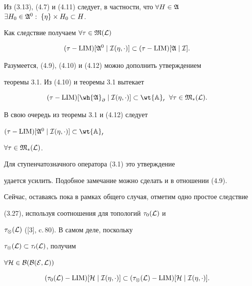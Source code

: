 Из (3.13), (4.7) и (4.11) следует, в частности, что $\forall H\in


\frak A$ $\exists H_0\in\frak A^0:\;\{\eta\}\times H_0\subset H$.


Как следствие получаем $\forall\tau\in\frak M(\cal L)$


\begin{equation}


(\tau-\LIM)[\frak A^0\mid\cal I(\eta,\cdot)]\subset


(\tau-\LIM)[\frak A\mid\cal I].


\end{equation}


Разумеется, (4.9), (4.10) и (4.12) можно дополнить утверждением


теоремы 3.1. Из (4.10) и теоремы 3.1 вытекает


\begin{equation}


(\tau-\LIM)[\wh{\frak A}_\partial\mid\cal I(\eta,


\cdot)]\subset\wt{\Bbb A}_0\ \;


\forall\tau\in\frak M_*(\cal L).


\end{equation}


В свою очередь из теоремы 3.1 и (4.12) следует


$(\tau-\LIM)[\frak A^0\mid\cal I(\eta,


\cdot)]\subset\wt{\Bbb A}_0$


$\forall\tau\in \frak M_*(\cal L)$.


Для ступенчатозначного оператора (3.1) это утверждение


удается усилить. Подобное замечание можно сделать и в отношении (4.9).


Сейчас, оставаясь пока в рамках общего случая, отметим одно простое следствие


(3.27), используя соотношения для топологий $\tau_0(\cal L)$ и


$\tau_\otimes(\cal L)$ ([3], c.\,80). В самом деле, поскольку


$\tau_\otimes(\cal L)\subset\tau_0(\cal L)$, получим


$\forall\cal H\in\cal B(B(E,\cal L))$


\begin{equation}


(\tau_0(\cal L)-\LIM)[\cal H\mid\cal I(\eta,\cdot)]


\subset(\tau_\otimes(\cal L)-\LIM)[\cal H\mid\cal I(\eta,\cdot)].


\end{equation}


